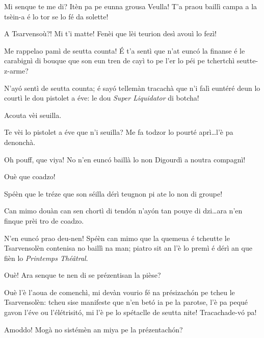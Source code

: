 \begin{drama}
\Pierrespeaks Mi senque te me di? Itèn pa pe eunna grousa Veulla! T'a praou baillì campa a la tsèin-a é lo tor se lo fé da solette!

\Laurentspeaks A Tsarvensoù?! Mi t'i matte! Fenèi que lèi teurion desì avouì lo fezì!

\Pierrespeaks Me rappelao pamì de seutta counta! \'E t'a sentì que n'at eunc\'o la finanse é le carabignì di bouque que son eun tren de cayì to pe l'er lo péi pe tchertchì seutte-z-arme?

\Laurentspeaks N'ay\'o sentì de seutta counta; é say\'o tellemàn tracachà que n'i falì euntéré deun lo courtì le dou pistolet a éve: le dou \textit{Super Liquidator} di botcha!

\Pierrespeaks Acouta vèi seuilla.


\Pierrespeaks {} Te vèi lo pistolet a éve que n'i seuilla?
Me fa todzor lo pourté aprì\ldots l'è pa denonchà.

\Laurentspeaks Oh pouff, que viya! No n'en eunc\'o baillà lo non Digourdì a noutra compagnì!

\Pierrespeaks Ouè que coadzo!

\Laurentspeaks  Spéèn que le tréze que son séilla dérì  teugnon pi ate lo non di groupe!

\Pierrespeaks Can mimo douàn can sen chortì di tend\'on n'ay\'on tan pouye di dzi\ldots ara n'en finque prèi tro de coadzo.

\Laurentspeaks N'en eunc\'o prao deu-nen! Spéèn can mimo que la quemeua é tcheutte le Tsarvensolèn contenisa no baillì na man; piatro sit an l'è lo premì é dérì an que fièn lo \textit{Printemps Thé\^{a}tral}.

\Pierrespeaks Ouè!  Ara senque te nen di se prézentisan la pièse?

\Laurentspeaks {} Ouè l'è l'aoua de comenchì, mi devàn vourio fé na présizach\'on pe tcheu le Tsarvensolèn: tcheu sise manifeste que n'en bet\'o ia pe la parotse, l'è pa pequé gavon l'éve ou l'élétrisit\'o, mi l'è pe lo spétaclle de seutta nite! Tracachade-v\'o pa!

\Pierrespeaks Amoddo! Mogà no sistémèn an miya pe la prézentach\'on?



\end{drama}
